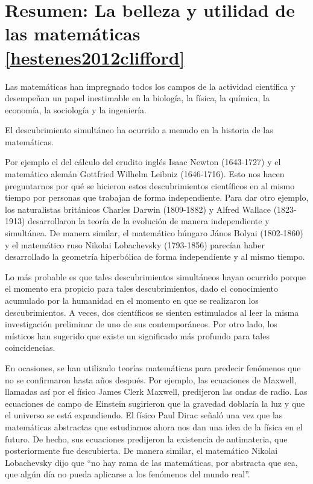 \section{Resumen: La belleza y utilidad de las matem\'aticas \ref{hestenes2012clifford}}

Las matem\'aticas han impregnado todos los campos de la actividad cient\'ifica y
desempe\~nan un papel inestimable en la biolog\'ia, la f\'isica, la qu\'imica,
la econom\'ia, la sociolog\'ia y la ingenier\'ia.


El descubrimiento simult\'aneo ha ocurrido a menudo en la historia de las
matem\'aticas.

Por ejemplo el del c\'alculo del erudito ingl\'es Isaac Newton (1643-1727) y el
matem\'atico alem\'an Gottfried Wilhelm Leibniz (1646-1716). Esto nos hacen
preguntarnos por qu\'e se hicieron estos descubrimientos cient\'ificos en al
mismo tiempo por personas que trabajan de forma independiente. Para dar otro
ejemplo, los naturalistas brit\'anicos Charles Darwin (1809-1882) y Alfred
Wallace (1823-1913) desarrollaron la teor\'ia de la evoluci\'on de manera
independiente y simult\'anea. De manera similar, el matem\'atico h\'ungaro
J\'anos Bolyai (1802-1860) y el matem\'atico ruso Nikolai Lobachevsky
(1793-1856) parec\'ian haber desarrollado la geometr\'ia hiperb\'olica de forma
independiente y al mismo tiempo.

Lo m\'as probable es que tales descubrimientos simult\'aneos hayan ocurrido
porque el momento era propicio para tales descubrimientos, dado el conocimiento
acumulado por la humanidad en el momento en que se realizaron los
descubrimientos. A veces, dos cient\'ificos se sienten estimulados al leer la
misma investigaci\'on preliminar de uno de sus contempor\'aneos. Por otro lado,
los m\'isticos han sugerido que existe un significado m\'as profundo para tales
coincidencias.

En ocasiones, se han utilizado teor\'ias matem\'aticas para predecir fen\'omenos
que no se confirmaron hasta a\~nos despu\'es. Por ejemplo, las ecuaciones de
Maxwell, llamadas as\'i por el f\'isico James Clerk Maxwell, predijeron las
ondas de radio. Las ecuaciones de campo de Einstein sugirieron que la gravedad
doblar\'ia la luz y que el universo se est\'a expandiendo. El f\'isico Paul
Dirac se\~nal\'o una vez que las matem\'aticas abstractas que estudiamos ahora
nos dan una idea de la f\'isica en el futuro. De hecho, sus ecuaciones
predijeron la existencia de antimateria, que posteriormente fue descubierta. De
manera similar, el matem\'atico Nikolai Lobachevsky dijo que “no hay rama de las
matem\'aticas, por abstracta que sea, que alg\'un d\'ia no pueda aplicarse a los
fen\'omenos del mundo real”.
